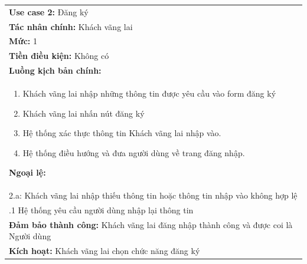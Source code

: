 \begin{center}
	\begin{tabularx}{\linewidth}{|X|}
		\cline{1-2}
		\textbf{Use case 2:} Đăng ký                                                               \\
		\textbf{Tác nhân chính:} Khách vãng lai                                                    \\
		\textbf{Mức:} 1                                                                            \\
		\textbf{Tiền điều kiện:} Không có                                                          \\
		\textbf{Luồng kịch bản chính:}                                                             \\
		\begin{enumerate}
			\vspace{-2em}
			\itemsep-0.5em
			\item Khách vãng lai nhập những thông tin được yêu cầu vào form đăng ký
			\item Khách vãng lai nhấn nút đăng ký
			\item Hệ thống xác thực thông tin Khách vãng lai nhập vào.
			\item Hệ thống điều hướng và đưa người dùng về trang đăng nhập.
			      \vspace{-1em}
		\end{enumerate}
		\textbf{Ngoại lệ:}                                                                         \\
		\hspace{1em}2.a: Khách vãng lai nhập thiếu thông tin hoặc thông tin nhập vào không hợp lệ  \\
		\hspace{2.5em}.1 Hệ thống yêu cầu người dùng nhập lại thông tin                            \\
		\textbf{Đảm bảo thành công:} Khách vãng lai đăng nhập thành công và được coi là Người dùng \\
		\textbf{Kích hoạt:} Khách vãng lai chọn chức năng đăng ký
		\cline{1-2}
	\end{tabularx}
\end{center}

